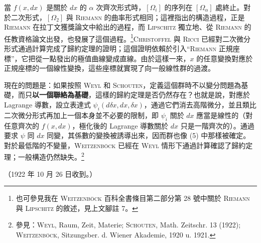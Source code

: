 \documentclass[11pt]{article}
\newcommand{\srcemph}[1]{\textbf{#1}}
\newcommand{\srcname}[1]{\textsc{#1}}
\begin{document}
當 $f(x,d x)$ 是關於 $d x$ 的 $\alpha$ 次齊次形式時，$[\Omega_i]$ 的序列在 $[\Omega_\alpha]$ 處終止。對於二次形式，$[\Omega_2]$ 與 \srcname{Riemann} 的曲率形式相同；這裡指出的構造過程，正是 \srcname{Riemann} 在拉丁文獲獎論文中給出的過程，而 \srcname{Lipschitz} 獨立地、從 \srcname{Riemann} 的任教資格論文出發，也發展了這個過程。\footnote{也可參見我在 \textsc{Weitzenböck} 百科全書條目第二部分第 28 號中關於 \textsc{Riemann} 與 \textsc{Lipschitz} 的敘述，見上文腳註 7。}\srcname{Christoffel} 與 \srcname{Ricci} 已經對二次微分形式通過計算完成了歸約定理的證明；這個證明依賴於引入“\srcname{Riemann} 正規座標”，它把從一點發出的極值曲線變成直線。由於這樣一來，$x$ 的任意變換對應於正規座標的一個線性變換，這些座標就實現了向一般線性群的過渡。

現在的問題是：如果按照 \srcname{Weyl} 和 \srcname{Schouten}，定義這個群時不以變分問題為基礎，而只\srcemph{以一個聯絡為基礎}，這樣的歸約定理是否仍然存在？也就是說，對應於 Lagrange 導數，設立表達式 $\psi_i(d\delta x,d x,\delta x)$，通過它們消去高階微分，並且類比二次微分形式再加上一個本身並不必要的限制，即 $\psi_i$ 關於 $d x$ 應當是線性的（對任意齊次的 $f(x,d x)$，極化後的 Lagrange 導數關於 $d x$ 只是一階齊次的）。通過要求 $\psi$ 同 $d x$ 同變，其係數的變換被誘導出來，因而群也像 (5) 中那樣被確定。對於最低階的不變量，\srcname{Weitzenböck} 已經在 \srcname{Weyl} 情形下通過計算確認了歸約定理；一般構造仍然缺失。\footnote{參見：\textsc{Weyl}, Raum, Zeit, Materie; \textsc{Schouten}, Math. Zeitschr. 13 (1922); \textsc{Weitzenböck}, Sitzungsber. d. Wiener Akademie, 1920 u. 1921.}

\begin{center}
（1922 年 10 月 26 日收到。）
\end{center}
\endgroup
\end{document}
